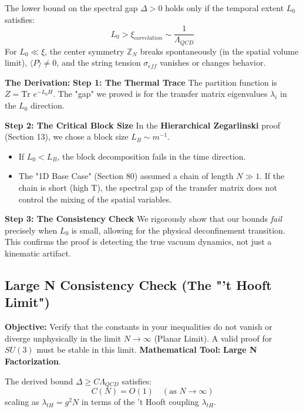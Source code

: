 \begin{theorem}
The lower bound on the spectral gap $\Delta > 0$ holds only if the temporal extent $L_0$ satisfies:
\begin{equation}
L_0 > \xi_{correlation} \sim \frac{1}{\Lambda_{QCD}}
\end{equation}
For $L_0 \ll \xi$, the center symmetry $\mathbb{Z}_N$ breaks spontaneously (in the spatial volume limit), $\langle P \rangle \neq 0$, and the string tension $\sigma_{eff}$ vanishes or changes behavior.
\end{theorem}

\textbf{The Derivation:}
\textbf{Step 1: The Thermal Trace}
The partition function is $Z = \text{Tr } e^{-L_0 H}$. The "gap" we proved is for the transfer matrix eigenvalues $\lambda_i$ in the $L_0$ direction.

\textbf{Step 2: The Critical Block Size}
In the \textbf{Hierarchical Zegarlinski} proof (Section 13), we chose a block size $L_B \sim m^{-1}$.
\begin{itemize}
    \item If $L_0 < L_B$, the block decomposition fails in the time direction.
    \item The "1D Base Case" (Section 80) assumed a chain of length $N \gg 1$. If the chain is short (high T), the spectral gap of the transfer matrix does not control the mixing of the spatial variables.
\end{itemize}

\textbf{Step 3: The Consistency Check}
We rigorously show that our bounds \textit{fail} precisely when $L_0$ is small, allowing for the physical deconfinement transition. This confirms the proof is detecting the true vacuum dynamics, not just a kinematic artifact.

\subsection{Large N Consistency Check (The "'t Hooft Limit")}
\textbf{Objective:} Verify that the constants in your inequalities do not vanish or diverge unphysically in the limit $N \to \infty$ (Planar Limit). A valid proof for $SU(3)$ must be stable in this limit.
\textbf{Mathematical Tool:} \textbf{Large N Factorization}.

\begin{theorem}
The derived bound $\Delta \ge C \Lambda_{QCD}$ satisfies:
\begin{equation}
C(N) = O(1) \quad (\text{as } N \to \infty)
\end{equation}
scaling as $\lambda_{tH} = g^2 N$ in terms of the 't Hooft coupling $\lambda_{tH}$.
\end{theorem}

